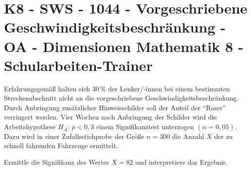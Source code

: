 \section{K8 - SWS - 1044 - Vorgeschriebene Geschwindigkeitsbeschränkung - OA - Dimensionen Mathematik 8 - Schularbeiten-Trainer}

\begin{beispiel}[K8 - SWS]{1}
Erfahrungsgemäß halten sich 30\,\% der Lenker/-innen bei einem bestimmten Streckenabschnitt nicht an die vorgeschriebene Geschwindigkeitsbeschränkung. Durch Anbringung zusätzlicher Hinweisschilder soll der Anteil der "`Raser"' verringert werden. Vier Wochen nach Anbringung der Schilder wird die Arbeitshypothese $H_A$: $p<0,3$ einem Signifikanztest unterzogen $(\alpha=0,05)$. Dazu wird in einer Zufallsstichprobe der Größe $n=300$ die Anzahl $X$ der zu schnell fahrenden Fahrzeuge ermittelt.

Ermittle die Signifikanz des Wertes $X=82$ und interpretiere das Ergebnis.

\end{beispiel}